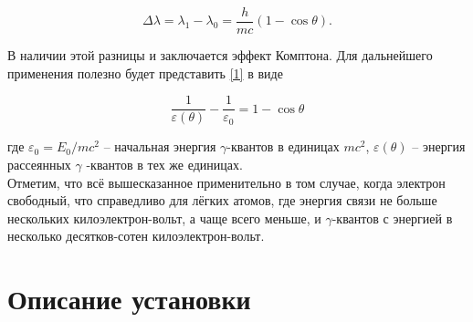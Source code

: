 \documentclass[15pt,a5paper,reqno]{article}
\begin{document}
\begin{equation}\label{1}
    \Delta \lambda = \lambda_1 - \lambda_0 = \dfrac{h}{mc} (1-\cos \theta).
\end{equation}

В наличии этой разницы и заключается эффект Комптона. Для дальнейшего применения полезно будет представить \eqref{1} в виде

\[ \frac{1}{\varepsilon(\theta)} - \dfrac{1}{\varepsilon_0} = 1 - \cos \theta \]

где $\varepsilon_0 = E_0/mc^2$ -- начальная энергия $\gamma$-квантов в единицах $mc^2$, $\varepsilon(\theta)$ -- энергия рассеянных $\gamma$ -квантов в тех же единицах.\\

Отметим, что всё вышесказанное применительно в том случае, когда электрон свободный, что справедливо для лёгких атомов, где энергия связи не больше нескольких килоэлектрон-вольт, а чаще всего меньше, и $\gamma$-квантов с энергией в несколько десятков-сотен килоэлектрон-вольт.

\section{Описание установки}



\end{document}
